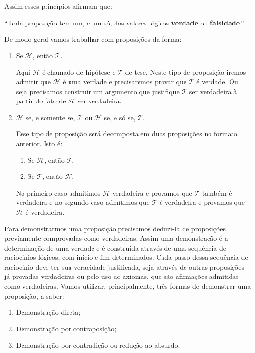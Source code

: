 Assim esses princ{\'\i}pios afirmam que:
\begin{center}
	``Toda proposi\c{c}\~ao tem um, e um s\'o, dos valores l\'ogicos \textbf{verdade} ou \textbf{falsidade}.''
\end{center}

De modo geral vamos trabalhar com proposi\c{c}\~oes da forma:
\begin{enumerate}[label={\roman*})]
	\item Se $\mathcal{H}$, ent\~ao $\mathcal{T}$.

	Aqui $\mathcal{H}$ \'e chamado de hip\'otese e $\mathcal{T}$ de tese. Neste tipo de proposi\c{c}\~ao iremos admitir que $\mathcal{H}$ \'e uma verdade e precisaremos provar que $\mathcal{T}$ \'e verdade. Ou seja precisamos construir um argumento que justifique $\mathcal{T}$ ser verdadeira \`a partir do fato de $\mathcal{H}$ ser verdadeira.

	\item $\mathcal{H}$ se, e somente se, $\mathcal{T}$ ou $\mathcal{H}$ se, e s\'o se, $\mathcal{T}$.

	Esse tipo de proposi\c{c}\~ao ser\'a decomposta em duas proposi\c{c}\~oes no formato anterior. Isto \'e:
	\begin{enumerate}[label={\alph*})]
		\item Se $\mathcal{H}$, ent\~ao $\mathcal{T}$.
		\item Se $\mathcal{T}$, ent\~ao $\mathcal{H}$.
	\end{enumerate}

	No primeiro caso admitimos $\mathcal{H}$ verdadeira e provamos que $\mathcal{T}$ tamb\'em \'e verdadeira e no segundo caso admitimos que $\mathcal{T}$ \'e verdadeira e provamos que $\mathcal{H}$ \'e verdadeira.
\end{enumerate}

Para demonstrarmos uma proposição precisamos deduzí-la de proposições previamente comprovadas como verdadeiras. Assim uma demonstração é a determinação de uma verdade e é construída através de uma sequência de raciocínios lógicos, com início e fim determinados. Cada passo dessa sequência de raciocínio deve ter sua veracidade justificada, seja através de outras proposições já provadas verdadeiras ou pelo uso de axiomas, que são afirmações admitidas como verdadeiras. Vamos utilizar, principalmente, três formas de demonstrar uma proposição, a saber:
\begin{enumerate}
	\item Demonstração direta;
	\item Demonstração por contraposição;
	\item Demonstração por contradição ou redução ao absurdo.
\end{enumerate}

